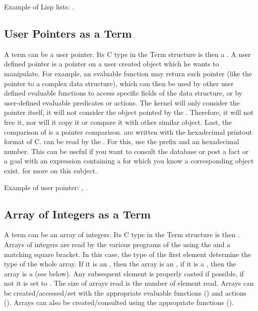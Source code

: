 Example of Lisp lists: .

\subsection{User Pointers as a Term}

A term can be a user pointer. Its C type in the Term structure is then a . A user
defined pointer is a pointer on a user created object which he wants to
manipulate. For example, an evaluable function may return such pointer (like
the pointer to a complex data structure), which can then be used by other user
defined evaluable functions to access specific fields of the data structure, or
by user-defined evaluable predicates or actions. The kernel will only consider
the pointer itself, it will not consider the object pointed by the
.  Therefore, it will not free it, nor will it copy it or
compare it with other similar object. Last, the comparison of 
is a pointer comparison.   are written with the hexadecimal
printout format of C.  can be read by the \CXPK{}. For this,
use the  prefix and an hexadecimal number.  This can be useful if you
want to consult the database or post a fact or a goal with an expression
containing a  for which you know a corresponding object
exist.  for more on this subject.

Example of user pointer: , .

\subsection{Array of Integers as a Term}

A term can be an array of integers. Its C type in the Term structure is then . Arrays
of integers are read by the various programs of the \COPRSDE{} using the
\samp{[} and a matching \samp{]} square bracket. In this case, the type of the
first element determine the type of the whole array. If it is an
, then the array is an , if it is a ,
then the array is a  (see below).  Any subsequent element is
properly casted if possible, if not it is set to . The size of arrays
read is the number of element read. Arrays can be created/accessed/set with the
appropriate evaluable functions () and actions (). Arrays can also
be created/consulted using the appropriate functions ().

